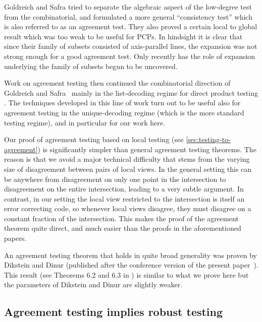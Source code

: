 \documentclass{toc}
\theoremstyle{plain}
\begin{document}
Goldreich and Safra \cite{GoldreichS2000} tried to separate the algebraic aspect of the low-degree test from the combinatorial, and formulated a more general ``consistency test'' which is also referred to as an agreement test. They also proved a certain local to global result which was too weak to be useful for PCPs. In hindsight it is clear that since their family of subsets consisted of
%
axis-parallel  %
lines, the expansion was not strong enough for a good agreement test.
Only recently \cite{DinurK2017, DiksteinD2019}
%
has %
the role of expansion underlying the family of subsets %
begun to be uncovered. 

Work on agreement testing then continued the combinatorial direction of Goldreich and Safra~\cite{GoldreichS2000} mainly in the list-decoding regime
for direct product testing
\cite{DinurR2006,DinurG2008,ImpagliazzoKW2012,DinurS2014-dp,DinurN2017}. The techniques developed in this line of work turn out to be useful also for agreement testing in the unique-decoding regime (which is the more standard testing regime), and in particular for our work here.

Our proof of agreement testing based on local testing (see \cref{sec:testing-to-agreement}) is significantly simpler than general agreement testing theorems. The reason is that we avoid a major technical difficulty that stems from the varying size of disagreement between pairs of local views. In the general setting this can be anywhere from disagreement on only one point in the intersection to disagreement on the entire intersection, leading to a very subtle argument. In contrast, in our setting the local view restricted to the intersection is itself an error correcting code, so whenever  local views disagree, they must disagree on a %
constant  %
fraction of the intersection. This makes the proof of the agreement theorem %
quite  %
direct, and much easier than the proofs in
the  %
aforementioned %
papers.  %

%
%
An agreement  %
testing theorem that holds in quite broad generality 
was proven by Dikstein and Dinur \cite{DiksteinD2019} 
(published after the %
conference version of the present paper~\cite{conf-version}).
%
%
This result (see Theorems 6.2 and 6.3 in %
\cite{DiksteinD2019}) is   %
%
similar to what we prove here but the parameters of Dikstein and Dinur are slightly weaker.
%
%

\subsection{Agreement testing implies robust testing}
\end{document}
